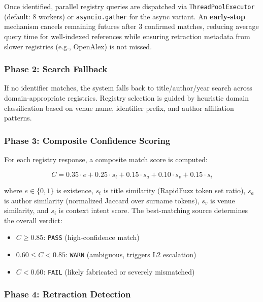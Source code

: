 \documentclass[sigconf,nonacm]{acmart}
\begin{document}
Once identified, parallel registry queries are dispatched via \texttt{ThreadPoolExecutor} (default: 8 workers) or \texttt{asyncio.gather} for the async variant.
An \textbf{early-stop} mechanism cancels remaining futures after 3 confirmed matches, reducing average query time for well-indexed references while ensuring retraction metadata from slower registries (e.g., OpenAlex) is not missed.

\subsubsection{Phase 2: Search Fallback}

If no identifier matches, the system falls back to title/author/year search across domain-appropriate registries.
Registry selection is guided by heuristic domain classification based on venue name, identifier prefix, and author affiliation patterns.

\subsubsection{Phase 3: Composite Confidence Scoring}

For each registry response, a composite match score is computed:

\begin{equation}
C = 0.35 \cdot e + 0.25 \cdot s_t + 0.15 \cdot s_a + 0.10 \cdot s_v + 0.15 \cdot s_i
\label{eq:composite}
\end{equation}

\noindent where $e \in \{0, 1\}$ is existence, $s_t$ is title similarity (RapidFuzz token set ratio), $s_a$ is author similarity (normalized Jaccard over surname tokens), $s_v$ is venue similarity, and $s_i$ is context intent score.
The best-matching source determines the overall verdict:

\begin{itemize}[leftmargin=*]
    \item $C \geq 0.85$: \texttt{PASS} (high-confidence match)
    \item $0.60 \leq C < 0.85$: \texttt{WARN} (ambiguous, triggers L2 escalation)
    \item $C < 0.60$: \texttt{FAIL} (likely fabricated or severely mismatched)
\end{itemize}

\subsubsection{Phase 4: Retraction Detection}
\end{document}
